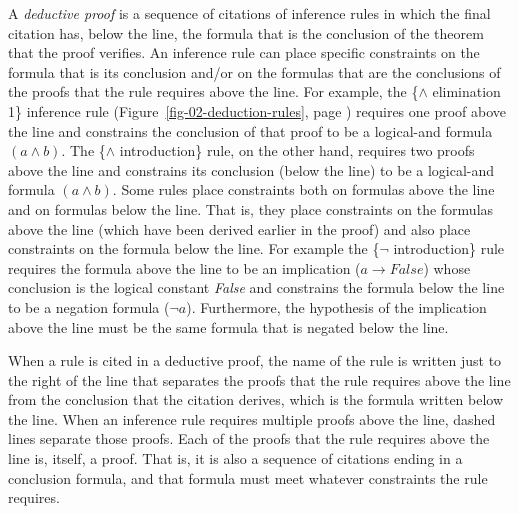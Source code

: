\label{def-deductive-proof}
A \emph{deductive proof} is a sequence of citations of inference rules
in which the final citation has, below the line,
the formula that is the conclusion of the theorem that the proof verifies.
An inference rule can place specific constraints on the formula
that is its conclusion and/or on the formulas that are the
conclusions of the proofs that the rule requires above the line.
For example, the \{$\wedge$ elimination 1\} inference rule
(Figure~\ref{fig-02-deduction-rules}, page \pageref{fig-02-deduction-rules})
requires one proof
above the line
and constrains the conclusion of that proof
to be a logical-and formula $(a \wedge b)$.
The \{$\wedge$ introduction\} rule, on the other hand,
requires two proofs above the line and
constrains its conclusion (below the line)
to be a logical-and formula $(a \wedge b)$.
Some rules place constraints both on formulas
above the line and on formulas below the line.
That is, they place constraints on the formulas
above the line (which have been derived earlier in the proof)
and also place constraints on the formula
below the line.
For example the \{$\neg$ introduction\} rule requires
the formula above the line to be an implication ($a \rightarrow False$)
whose conclusion is the logical constant \emph{False}
and constrains the formula below the line to be
a negation formula ($\neg a$).
Furthermore, the hypothesis of the implication above the line must be the same
formula that is negated below the line.

When a rule is
cited
in a deductive proof,
the name of the rule is written just to the right of
the line that separates the proofs that the rule requires above the line
from the conclusion that the citation derives,
which is the formula written below the line.
When an inference rule requires multiple proofs above the line,
dashed lines separate those proofs.
Each of the proofs that the rule requires above the line
is, itself, a proof.
That is, it is also a sequence of citations ending in a conclusion formula,
and that formula must meet whatever constraints the rule requires.

